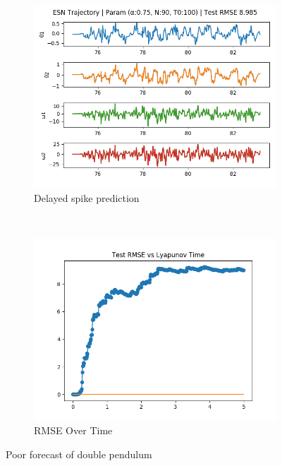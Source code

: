 \documentclass{article}
\begin{document}
\begin{figure}[H]
    \centering
    \begin{subfigure}[b]{0.45\textwidth}
        \includegraphics[width=\textwidth]{doc/paper/images/doub_pend/rank_4_param_127_fit.png}
        \caption{Delayed spike prediction}
    \end{subfigure}
    ~
    \begin{subfigure}[b]{0.45\textwidth}
        \includegraphics[width=\textwidth]{doc/paper/images/doub_pend/rank_4_param_127_rmse.png}
        \caption{RMSE Over Time}
    \end{subfigure}
    \caption{Poor forecast of double pendulum}
\end{figure}
\end{document}
